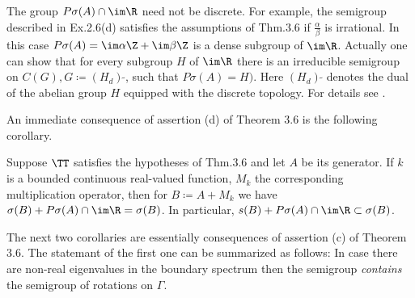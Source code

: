The group $P\sigma(A) \cap \im\R$ need not be discrete. For example, the semigroup described in Ex.2.6(d) satisfies the assumptions of Thm.3.6 if $\frac{\alpha}{\beta}$ is irrational. In this case $P\sigma(A) = \im\alpha \Z + \im\beta \Z$ is a dense subgroup of $\im \R$. Actually one can show that for every subgroup $H$ of $\im \R$ there is an irreducible semigroup on $C(G), G \coloneqq (H_d)\,{\tilde{ }}$, such that 
$P\sigma(A) = H)$. Here $(H_d)\,{\tilde{ }}$ denotes the dual of the abelian group $H$ equipped with the discrete topology. For details see \citet[p.62]{greiner:1982}. 

An immediate consequence of assertion (d) of Theorem 3.6 is the following corollary. 
\begin{corollary}\label{cor:b3-3.7}
Suppose $\TT$ satisfies the hypotheses of Thm.3.6 and let $A$ be its generator.
If $k$ is a bounded continuous real-valued function, $M_{k}$ the corresponding multiplication operator, then for $B \coloneq A + M_{k}$ we have $\sigma(B) + P\sigma(A)\cap \im\R = \sigma(B)$.
In particular, $s(B) + P\sigma(A)\cap \im\R \subset \sigma(B)$.
\end{corollary}
The next two corollaries are essentially consequences of assertion (c) of Theorem 3.6. 
The statemant of the first one can be summarized as follows: 
In case there are non-real eigenvalues in the boundary spectrum then 
the semigroup \emph{contains} the semigroup of rotations on $\Gamma$.


